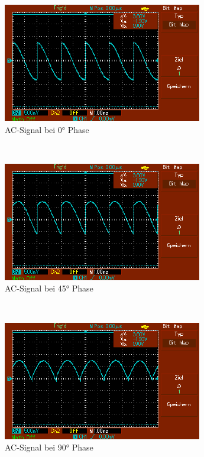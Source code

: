 \documentclass[captions=tableheading]{scrartcl}
\begin{document}
\begin{itemize}
            \begin{figure}
                \centering
                \includegraphics{Lock_In Bilder/Aufgabe 2/MAP001.pdf}
                \caption{AC-Signal bei 0° Phase}
                \label{fig:0sig}
            \end{figure}
            \\
           
            \begin{figure}
                \centering
                \includegraphics{Lock_In Bilder/Aufgabe 2/MAP002.pdf}
                \caption{AC-Signal bei 45° Phase}
                \label{fig:45sig}
            \end{figure}
            \\
           
            \begin{figure}
                \centering
                \includegraphics{Lock_In Bilder/Aufgabe 2/MAP003.pdf}
                \caption{AC-Signal bei 90° Phase}
                \label{fig:90sig}
            \end{figure}
            \\
            \newpage
         

\end{itemize}
\end{document}
